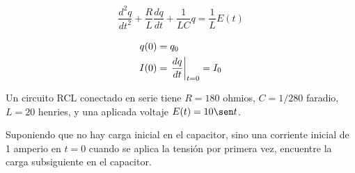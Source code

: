 {}
\begin{align}
	\dfrac{d^{2}q}{dt^{2}}
	+\dfrac{R}{L}\dfrac{dq}{dt}
	+\dfrac{1}{LC}q =
	\dfrac{1}{L}E(t)
\end{align}


{}
\begin{align}
	q(0) &= q_{0}\\
	I(0) &= \left. \dfrac{dq}{dt} \right|_{t=0}=I_{0}
\end{align}


{}
\begin{resuelto}
	Un circuito RCL conectado en serie tiene $R = 180$ ohmios, $C = 1/280$ faradio, $L = 20$ henries, y una aplicada
	voltaje $E(t) = 10 \sen t$.


	Suponiendo que no hay carga inicial en el capacitor, sino una corriente inicial de 1 amperio en
	$t = 0$ cuando se aplica la tensión por primera vez, encuentre la carga subsiguiente en el capacitor.
\end{resuelto}



